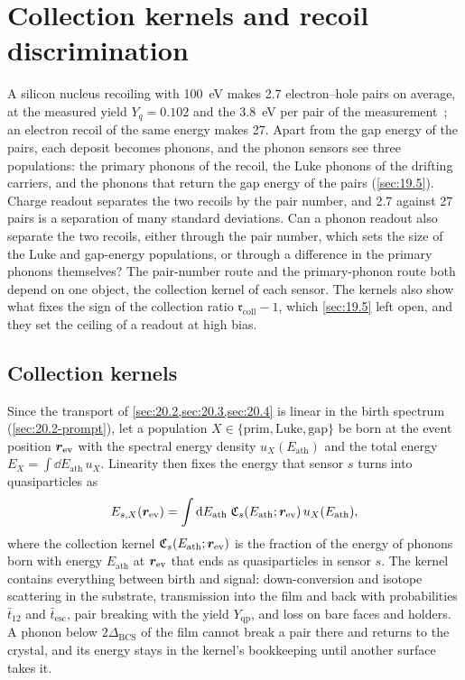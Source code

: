 \section{Collection kernels and recoil discrimination}\label{sec:20.5}

A silicon nucleus recoiling with \SI{100}{eV} makes 2.7 electron--hole pairs on average, at the measured yield $Y_q = 0.102$ and the \SI{3.8}{eV} per pair of the measurement~\cite[Eq.~(1), Table~II]{albakry2023first}; an electron recoil of the same energy makes 27. Apart from the gap energy of the pairs, each deposit becomes phonons, and the phonon sensors see three populations: the primary phonons of the recoil, the Luke phonons of the drifting carriers, and the phonons that return the gap energy of the pairs (\cref{sec:19.5}). Charge readout separates the two recoils by the pair number, and 2.7 against 27 pairs is a separation of many standard deviations. Can a phonon readout also separate the two recoils, either through the pair number, which sets the size of the Luke and gap-energy populations, or through a difference in the primary phonons themselves? The pair-number route and the primary-phonon route both depend on one object, the collection kernel of each sensor. The kernels also show what fixes the sign of the collection ratio $\mathfrak{r}_{\mathrm{coll}} - 1$, which \cref{sec:19.5} left open, and they set the ceiling of a readout at high bias.

\subsection{Collection kernels}\label{sec:20.5-kernels}

Since the transport of \cref{sec:20.2,sec:20.3,sec:20.4} is linear in the birth spectrum (\cref{sec:20.2-prompt}), let a population $X \in \{\mathrm{prim}, \mathrm{Luke}, \mathrm{gap}\}$ be born at the event position $\bm{r}_{\mathrm{ev}}$ with the spectral energy density $u_X(E_{\mathrm{ath}})$ and the total energy $E_X = \int\dd E_{\mathrm{ath}}\,u_X$. Linearity then fixes the energy that sensor $s$ turns into quasiparticles as
\begin{equation}
  E_{s,X}(\bm{r}_{\mathrm{ev}}) = \int\mathrm{d} E_{\mathrm{ath}}\;\mathfrak{C}_s(E_{\mathrm{ath}};\bm{r}_{\mathrm{ev}})\,u_X(E_{\mathrm{ath}}) ,
  \label{eq:20.5-kernel}
\end{equation}
where the collection kernel $\mathfrak{C}_s(E_{\mathrm{ath}};\bm{r}_{\mathrm{ev}})$ is the fraction of the energy of phonons born with energy $E_{\mathrm{ath}}$ at $\bm{r}_{\mathrm{ev}}$ that ends as quasiparticles in sensor $s$. The kernel contains everything between birth and signal: down-conversion and isotope scattering in the substrate, transmission into the film and back with probabilities $\bar t_{12}$ and $\bar t_{\mathrm{esc}}$, pair breaking with the yield $Y_{\mathrm{qp}}$, and loss on bare faces and holders. A phonon below $2\Delta_{\mathrm{BCS}}$ of the film cannot break a pair there and returns to the crystal, and its energy stays in the kernel's bookkeeping until another surface takes it.

